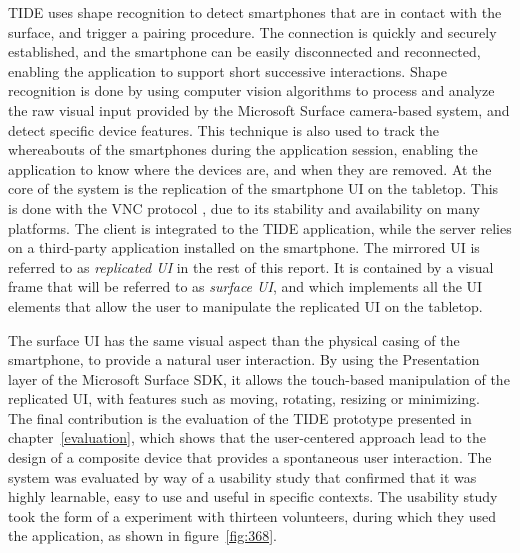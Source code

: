 TIDE uses shape recognition to detect smartphones that are in contact with the surface, and trigger a pairing procedure.
The connection is quickly and securely established, and the smartphone can be easily disconnected and reconnected, enabling the application to support short successive interactions.
Shape recognition is done by using computer vision algorithms to process and analyze the raw visual input provided by the Microsoft Surface camera-based system, and detect specific device features.
This technique is also used to track the whereabouts of the smartphones during the application session, enabling the application to know where the devices are, and when they are removed.
At the core of the system is the replication of the smartphone UI on the tabletop.
This is done with the VNC protocol \citep{Richardson:1998:vnc}, due to its stability and availability on many platforms.
The client is integrated to the TIDE application, while the server relies on a third-party application installed on the smartphone.
The mirrored UI is referred to as \emph{replicated UI} in the rest of this report.
It is contained by a visual frame that will be referred to as \emph{surface UI}, and which implements all the UI elements that allow the user to manipulate the replicated UI on the tabletop.
%

The surface UI has the same visual aspect than the physical casing of the smartphone, to provide a natural user interaction.
By using the Presentation layer of the Microsoft Surface SDK, it allows the touch-based manipulation of the replicated UI, with features such as moving, rotating, resizing or minimizing.
\\
\linebreak
The final contribution is the evaluation of the TIDE prototype presented in chapter~\ref{evaluation}, which shows that the user-centered approach lead to the design of a composite device that provides a spontaneous user interaction.
The system was evaluated by way of a usability study that confirmed that it was highly learnable, easy to use and useful in specific contexts.
The usability study took the form of a experiment with thirteen volunteers, during which they used the application, as shown in figure~\ref{fig:368}.

